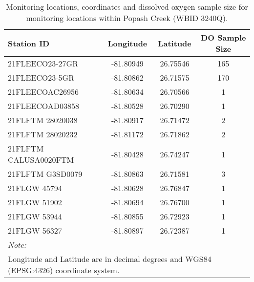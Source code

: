 \documentclass[]{interact}
\theoremstyle{plain}%
\theoremstyle{definition}
\theoremstyle{remark}
\begin{document}
\begin{table}[H]

\caption{\label{tab:tabs2}\label{tab_s2} Monitoring locations, coordinates and dissolved oxygen sample size for monitoring locations within Popash Creek (WBID 3240Q).}
\centering
\fontsize{10}{12}\selectfont
\begin{tabular}[t]{lccc}
\toprule
\textbf{Station ID} & \textbf{Longitude} & \textbf{Latitude} & \textbf{DO Sample Size}\\
\midrule
21FLEECO23-27GR & -81.80949 & 26.75546 & 165\\
21FLEECO23-5GR & -81.80862 & 26.71575 & 170\\
21FLEECOAC26956 & -81.80634 & 26.70566 & 1\\
21FLEECOAD03858 & -81.80528 & 26.70290 & 1\\
21FLFTM 28020038 & -81.80917 & 26.71472 & 2\\
\addlinespace
21FLFTM 28020232 & -81.81172 & 26.71862 & 2\\
21FLFTM CALUSA0020FTM & -81.80428 & 26.74247 & 1\\
21FLFTM G3SD0079 & -81.80863 & 26.71581 & 3\\
21FLGW  45794 & -81.80628 & 26.76847 & 1\\
21FLGW  51902 & -81.80694 & 26.76700 & 1\\
\addlinespace
21FLGW  53944 & -81.80855 & 26.72923 & 1\\
21FLGW  56327 & -81.80897 & 26.72387 & 1\\
\bottomrule
\multicolumn{4}{l}{\rule{0pt}{1em}\textit{Note: }}\\
\multicolumn{4}{l}{\rule{0pt}{1em}Longitude and Latitude are in decimal degrees and WGS84 (EPSG:4326) coordinate system.}\\
\end{tabular}
\end{table}
\end{document}
